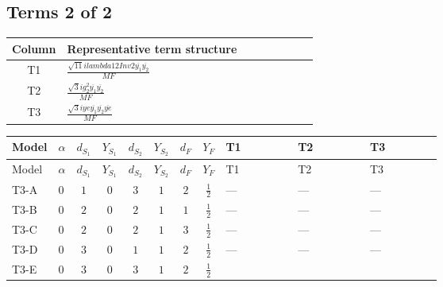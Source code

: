 \documentclass[8pt]{article}
\begin{document}
\begin{landscape}
\subsection*{Terms 2 of 2}
\begin{center}
\begin{tabular}{@{}c >{\raggedright\arraybackslash}p{0.82\linewidth}@{}}
\toprule
Column & Representative term structure \\
\midrule
T1 & \(\displaystyle \frac{\sqrt{11} i lambda12Inv2 \overline{y_{1}} \overline{y_{2}}}{MF}\) \\
\midrule
T2 & \(\displaystyle \frac{\sqrt{3} i g_{2}^{2} \overline{y_{1}} \overline{y_{2}}}{MF}\) \\
\midrule
T3 & \(\displaystyle \frac{\sqrt{3} i ye \overline{y_{1}} \overline{y_{2}} \overline{ye}}{MF}\) \\
\midrule
\bottomrule
\end{tabular}
\end{center}
\smallskip
\tiny
\begin{longtable}{@{}llcccccc >{\raggedright\arraybackslash}p{0.21\linewidth} >{\raggedright\arraybackslash}p{0.21\linewidth} >{\raggedright\arraybackslash}p{0.21\linewidth}@{}}
\toprule
Model & $\alpha$ & $d_{S_1}$ & $Y_{S_1}$ & $d_{S_2}$ & $Y_{S_2}$ & $d_F$ & $Y_F$ & T1 & T2 & T3 \\
\midrule
\endfirsthead
\toprule
Model & $\alpha$ & $d_{S_1}$ & $Y_{S_1}$ & $d_{S_2}$ & $Y_{S_2}$ & $d_F$ & $Y_F$ & T1 & T2 & T3 \\
\midrule
\endhead
T3-A & $0$ & $1$ & $0$ & $3$ & $1$ & $2$ & $\frac{1}{2}$ & --- & --- & --- \\
\midrule
T3-B & $0$ & $2$ & $0$ & $2$ & $1$ & $1$ & $\frac{1}{2}$ & --- & --- & --- \\
\midrule
T3-C & $0$ & $2$ & $0$ & $2$ & $1$ & $3$ & $\frac{1}{2}$ & --- & --- & --- \\
\midrule
T3-D & $0$ & $3$ & $0$ & $1$ & $1$ & $2$ & $\frac{1}{2}$ & --- & --- & --- \\
\midrule
T3-E & $0$ & $3$ & $0$ & $3$ & $1$ & $2$ & $\frac{1}{2}$ & \scriptsize\adjustbox{max width=\linewidth}{$\begin{gathered} \frac{3 \sqrt{11} i lambda12Inv2 \overline{y_{1}} \overline{y_{2}}}{22 MF}\end{gathered}$} & \scriptsize\adjustbox{max width=\linewidth}{$\begin{gathered} \frac{11 \sqrt{3} i g_{2}^{2} \overline{y_{1}} \overline{y_{2}}}{8 MF}\end{gathered}$} & \scriptsize\adjustbox{max width=\linewidth}{$\begin{gathered} - \frac{\sqrt{3} i ye \overline{y_{1}} \overline{y_{2}} \overline{ye}}{12 MF}\end{gathered}$} \\
\midrule
\bottomrule
\end{longtable}
\clearpage

\end{landscape}
\end{document}
